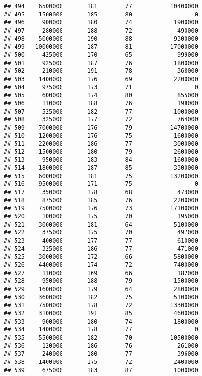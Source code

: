 \documentclass[
]{article}
\begin{document}
\begin{verbatim}
## 494    6500000       181        77           10400000
## 495    1500000       185        80                  0
## 496     900000       180        74            1900000
## 497     280000       188        72             490000
## 498    5000000       190        88            9300000
## 499   10000000       187        81           17000000
## 500     425000       170        65             999000
## 501     925000       187        76            1800000
## 502     210000       191        78             368000
## 503    1400000       176        69            2200000
## 504     975000       173        71                  0
## 505     600000       174        80             855000
## 506     110000       188        76             198000
## 507     525000       182        77            1000000
## 508     325000       177        72             764000
## 509    7000000       176        79           14700000
## 510    1200000       176        75            1600000
## 511    2200000       186        77            3000000
## 512    1500000       180        79            2600000
## 513     950000       183        84            1600000
## 514    1800000       187        85            3300000
## 515    6000000       181        75           13200000
## 516    9500000       171        75                  0
## 517     350000       178        68             473000
## 518     875000       185        76            2200000
## 519    7500000       176        73           17100000
## 520     100000       175        70             195000
## 521    3000000       181        64            5100000
## 522     375000       175        70             497000
## 523     400000       177        77             610000
## 524     325000       186        77             471000
## 525    3000000       172        66            5800000
## 526    4400000       174        72            7400000
## 527     110000       169        66             182000
## 528     950000       188        79            1500000
## 529    1600000       179        64            2800000
## 530    3600000       182        75            5100000
## 531    7500000       178        72           13300000
## 532    3100000       191        85            4600000
## 533     900000       180        74            1800000
## 534    1400000       178        77                  0
## 535    5500000       182        70           10500000
## 536     120000       186        76             261000
## 537     240000       180        77             396000
## 538    1400000       175        72            2400000
## 539     675000       183        87            1000000

\end{verbatim}
\end{document}
